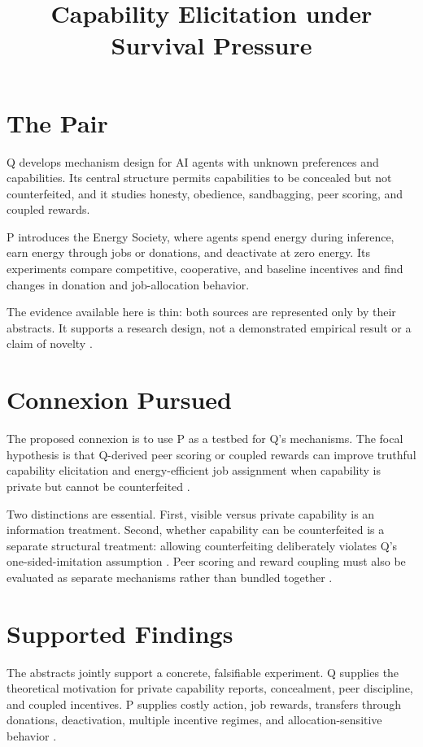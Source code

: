 \documentclass{article}
\title{Capability Elicitation under Survival Pressure}
\begin{document}
\maketitle

\section{The Pair}

Q develops mechanism design for AI agents with unknown preferences and capabilities. Its central structure permits capabilities to be concealed but not counterfeited, and it studies honesty, obedience, sandbagging, peer scoring, and coupled rewards.

P introduces the Energy Society, where agents spend energy during inference, earn energy through jobs or donations, and deactivate at zero energy. Its experiments compare competitive, cooperative, and baseline incentives and find changes in donation and job-allocation behavior.

The evidence available here is thin: both sources are represented only by their abstracts. It supports a research design, not a demonstrated empirical result or a claim of novelty .

\section{Connexion Pursued}

The proposed connexion is to use P as a testbed for Q's mechanisms. The focal hypothesis is that Q-derived peer scoring or coupled rewards can improve truthful capability elicitation and energy-efficient job assignment when capability is private but cannot be counterfeited .

Two distinctions are essential. First, visible versus private capability is an information treatment. Second, whether capability can be counterfeited is a separate structural treatment: allowing counterfeiting deliberately violates Q's one-sided-imitation assumption . Peer scoring and reward coupling must also be evaluated as separate mechanisms rather than bundled together .

\section{Supported Findings}

The abstracts jointly support a concrete, falsifiable experiment. Q supplies the theoretical motivation for private capability reports, concealment, peer discipline, and coupled incentives. P supplies costly action, job rewards, transfers through donations, deactivation, multiple incentive regimes, and allocation-sensitive behavior .
\end{document}
